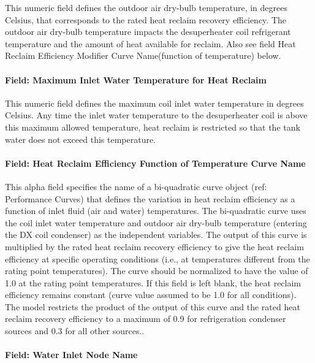 This numeric field defines the outdoor air dry-bulb temperature, in degrees Celsius, that corresponds to the rated heat reclaim recovery efficiency. The outdoor air dry-bulb temperature impacts the desuperheater coil refrigerant temperature and the amount of heat available for reclaim. Also see field Heat Reclaim Efficiency Modifier Curve Name(function of temperature) below.

\paragraph{Field: Maximum Inlet Water Temperature for Heat Reclaim}\label{field-maximum-inlet-water-temperature-for-heat-reclaim}

This numeric field defines the maximum coil inlet water temperature in degrees Celsius. Any time the inlet water temperature to the desuperheater coil is above this maximum allowed temperature, heat reclaim is restricted so that the tank water does not exceed this temperature.

\paragraph{Field: Heat Reclaim Efficiency Function of Temperature Curve Name}\label{field-heat-reclaim-efficiency-function-of-temperature-curve-name}

This alpha field specifies the name of a bi-quadratic curve object (ref: Performance Curves) that defines the variation in heat reclaim efficiency as a function of inlet fluid (air and water) temperatures. The bi-quadratic curve uses the coil inlet water temperature and outdoor air dry-bulb temperature (entering the DX coil condenser) as the independent variables. The output of this curve is multiplied by the rated heat reclaim recovery efficiency to give the heat reclaim efficiency at specific operating conditions (i.e., at temperatures different from the rating point temperatures). The curve should be normalized to have the value of 1.0 at the rating point temperatures. If this field is left blank, the heat reclaim efficiency remains constant (curve value assumed to be 1.0 for all conditions). The model restricts the product of the output of this curve and the rated heat reclaim recovery efficiency to a maximum of 0.9 for refrigeration condenser sources and 0.3 for all other sources..

\paragraph{Field: Water Inlet Node Name}\label{field-water-inlet-node-name-4-000}

